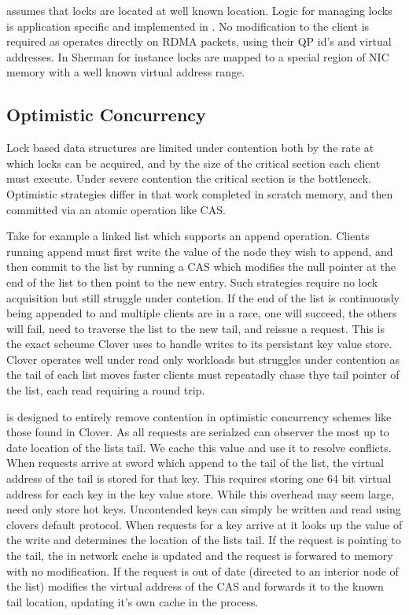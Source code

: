 \sword assumes that locks are located at well known
location. Logic for managing locks is application specific
and implemented in \sword. No modification to the client is
required as \sword operates directly on RDMA packets, using
their QP id's and virtual addresses. In Sherman for instance
locks are mapped to a special region of NIC memory with a
well known virtual address range.

\subsection{Optimistic Concurrency}

Lock based data structures are limited under contention both
by the rate at which locks can be acquired, and by the size
of the critical section each client must execute. Under
severe contention the critical section is the bottleneck.
Optimistic strategies differ in that work completed in
scratch memory, and then committed via an atomic operation
like CAS. 

Take for example a linked list which supports an append
operation. Clients running append must first write the
value of the node they wish to append, and then commit to
the list by running a CAS which modifies the null pointer at
the end of the list to then point to the new entry. Such
strategies require no lock acquisition but still struggle
under contetion. If the end of the list is continuously
being appended to and multiple clients are in a race, one
will succeed, the others will fail, need to traverse the
list to the new tail, and reissue a request. This is the
exact scheume Clover uses to handle writes to its persistant
key value store. Clover operates well under read only
workloads but struggles under contention as the tail of each
list moves faster clients must repeatadly chase thye tail
pointer of the list, each read requiring a round trip.

\sword is designed to entirely remove contention in
optimistic concurrency schemes like those found in Clover.
As all requests are serialzed \sword can observer the most
up to date location of the lists tail. We cache this value
and use it to resolve conflicts. When requests arrive at
sword which append to the tail of the list, the virtual
address of the tail is stored for that key. This requires
storing one 64 bit virtual address for each key in the key
value store. While this overhead may seem large, \sword need
only store hot keys. Uncontended keys can simply be written
and read using clovers default protocol. When requests for a
key arrive at \sword it looks up the value of the write and
determines the location of the lists tail. If the request is
pointing to the tail, the in network cache is updated and
the request is forwared to memory with no modification. If
the request is out of date (directed to an interior node of
the list) \sword modifies the virtual address of the CAS and
forwards it to the known tail location, updating it's own
cache in the process.

